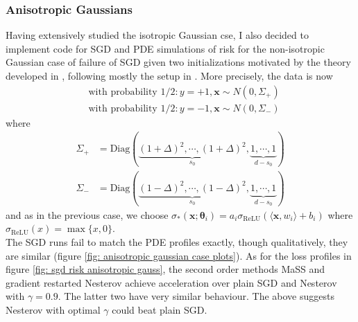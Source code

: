 \documentclass{article}
\theoremstyle{mystyle}
\newcommand{\bracket}[2]{\langle #1, #2\rangle}
\begin{document}
\subsubsection{Anisotropic Gaussians}
Having extensively studied the isotropic Gaussian cse, I also decided to implement code for SGD and PDE simulations of risk for the non-isotropic Gaussian case of failure of SGD given two initializations motivated by the theory developed in \cite{Mei_2018}, following mostly the setup in \cite[p. 98--99]{Mei_2018}. More precisely, the data is now 
\begin{equation}
\begin{array}{cc}
& \text{with probability }  1/2: y = +1, \mathbf{x}\sim N(0, \Sigma_+)\\
& \text{with probability }  1/2: y = -1, \mathbf{x}\sim N(0, \Sigma_-)
\end{array}
\end{equation}
where 
\begin{equation}
\begin{array}{cc}
	\Sigma_+ &= \text{Diag}(\underbrace{(1+\Delta)^{2}, \cdots, (1+\Delta)^{2}}_{s_0}, \underbrace{1,\cdots, 1}_{d-s_0})\\ 
 \Sigma_- &= \text{Diag}(\underbrace{(1-\Delta)^{2}, \cdots, (1-\Delta)^{2}}_{s_0}, \underbrace{1,\cdots, 1}_{d-s_0})
\end{array}
\end{equation}
and as in the previous case, we choose $\sigma_*(\mathbf{x};\mathbf{\theta}_{i})=a_{i}\sigma_{\text{ReLU}}(\bracket{\mathbf{x}}{w_{i}}+b_{i})$  where $ \sigma_{\text{ReLU}}(x) = \max\{x,0\}$.\\ 

The SGD runs fail to match the PDE profiles exactly, though qualitatively, they are similar (figure \ref{fig: anisotropic gaussian case plots}). As for the loss profiles in figure \ref{fig: sgd risk anisotropic gauss}, the second order methods MaSS and gradient restarted Nesterov achieve acceleration over plain SGD and Nesterov with $ \gamma = 0.9$. The latter two have very similar behaviour. The above suggests Nesterov with optimal $ \gamma$ could beat plain SGD.
\end{document}
